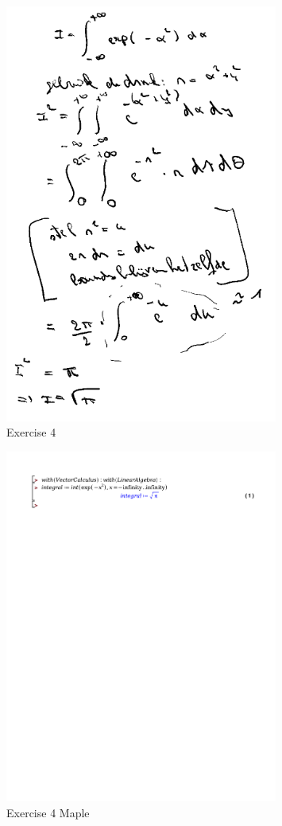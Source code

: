 \documentclass[a4paper]{report}
\begin{document}
\begin{figure}[H]
	\centering
	\includegraphics[width=0.8\textwidth]{assets/huis_5_ex_4.png}
	\caption{Exercise 4}
	\label{fig:huis_5_ex_4}
\end{figure}

\begin{figure}[H]
	\centering
	\includegraphics[width=0.8\textwidth]{exercises/huis_5_ex_4.pdf}
	\caption{Exercise 4 Maple}
	\label{fig:huis_5_ex_4_maple}
\end{figure}
\end{document}
